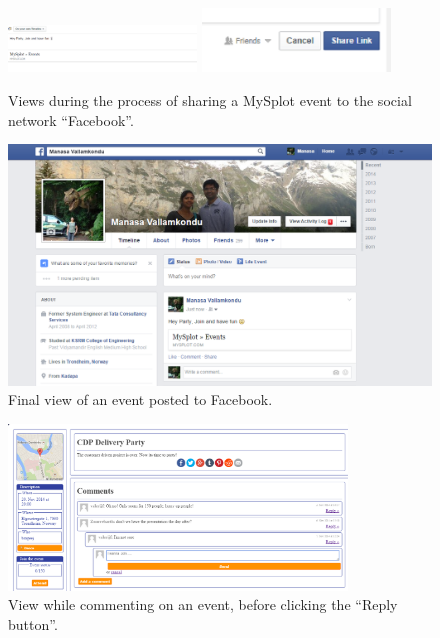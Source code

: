 \begin{figure}[ht!]
  \centering
  \includegraphics[width=50mm]{Sprint5/img/test2.png}
  \includegraphics[width=50mm]{Sprint5/img/test3.png}
  \caption{Views during the process of sharing a MySplot event to the social network ``Facebook''. }
  \label{fig:S5TestSharingFacebook}
\end{figure}

\begin{figure}[ht!]
  \centering
  \includegraphics[width=\linewidth]{Sprint5/img/test4.png}
  \caption{Final view of an event posted to Facebook.}
  \label{fig:S5TestFacebookView}
\end{figure}

\begin{figure}[ht!]
  \centering
  \includegraphics[width=90mm]{Sprint5/img/test5.png}
  \caption{View while commenting on an event, before clicking the ``Reply button''. }
  \label{fig:S5TestBeforeComment}
\end{figure}

